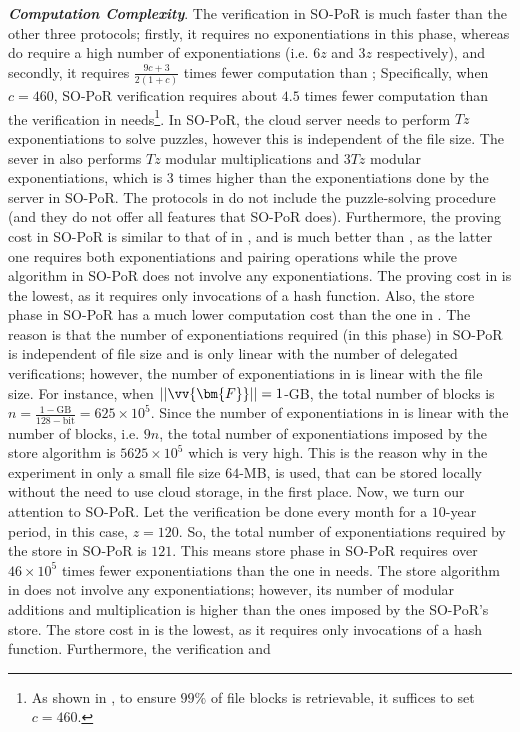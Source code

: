 \noindent\textbf{\textit{Computation Complexity}}.  The verification in SO-PoR is much faster than the other three protocols; firstly, it requires no exponentiations in this phase, whereas \cite{xu2016lightweight,Storage-Time} do require a high number of exponentiations (i.e. $6z$ and $3z$ respectively), and secondly, it requires $\frac{9c+3}{2(1+c)}$ times fewer computation than \cite{armknecht2014outsourced};  Specifically, when $c=460$,  SO-PoR verification requires about $4.5$ times fewer computation than the verification in \cite{armknecht2014outsourced} needs\footnote{As shown in \cite{DBLP:conf/ccs/AtenieseBCHKPS07}, to ensure $99\%$ of file blocks is retrievable, it  suffices to set $c=460$.}. In SO-PoR, the cloud server needs to perform $Tz$ exponentiations to solve puzzles, however this is independent of the file size. The sever in \cite{Storage-Time} also performs $Tz$ modular multiplications and $3Tz$ modular exponentiations, which is  $3$ times higher than the  exponentiations done by the server in SO-PoR. The  protocols in \cite{armknecht2014outsourced,DBLP:conf/asiacrypt/ShachamW08} do not include the puzzle-solving procedure (and they do not offer all features that SO-PoR does).  Furthermore, the proving cost in SO-PoR is similar to that of in \cite{armknecht2014outsourced}, and is  much better than \cite{xu2016lightweight}, as the latter one requires both exponentiations and pairing operations while the prove algorithm in SO-PoR  does not involve any exponentiations. The  proving cost in \cite{Storage-Time} is the lowest, as it requires only invocations of a hash function.  Also, the store phase in SO-PoR has a much lower computation cost than the one in \cite{armknecht2014outsourced}. The reason is that the number of exponentiations required (in this phase) in SO-PoR is independent of file size and is only linear with the number of delegated verifications; however, the number of exponentiations in \cite{armknecht2014outsourced} is linear with the file size. For instance, when $||\vv{\bm{F}}||=1$-GB, the  total number of blocks is   $n=\frac{1-\text{GB}}{128-\text{bit}}=625\times 10^{\scriptscriptstyle 5}$. Since the number of exponentiations in \cite{armknecht2014outsourced} is linear with the number of blocks, i.e. $9n$, the total number of exponentiations imposed by the store algorithm is $5625\times 10^{\scriptscriptstyle 5}$ which is very high. This is the reason why in the experiment in \cite{armknecht2014outsourced} only a small file size $64$-MB, is used, that can be stored locally without the need to use  cloud storage, in the first place.  Now, we turn our attention to SO-PoR. Let the verification be done every month for a $10$-year period, in this case,  $z=120$.  So, the total number of exponentiations required by the store in SO-PoR is $121$. This means store phase in SO-PoR requires over $46\times 10^{\scriptscriptstyle 5}$ times  fewer exponentiations than the one in \cite{armknecht2014outsourced} needs. The store algorithm in \cite{xu2016lightweight} does not involve any exponentiations; however, its  number of modular additions and multiplication  is higher than the ones imposed by the SO-PoR's store. The  store cost in \cite{Storage-Time} is the lowest, as it requires only invocations of a hash function. Furthermore, the verification and 